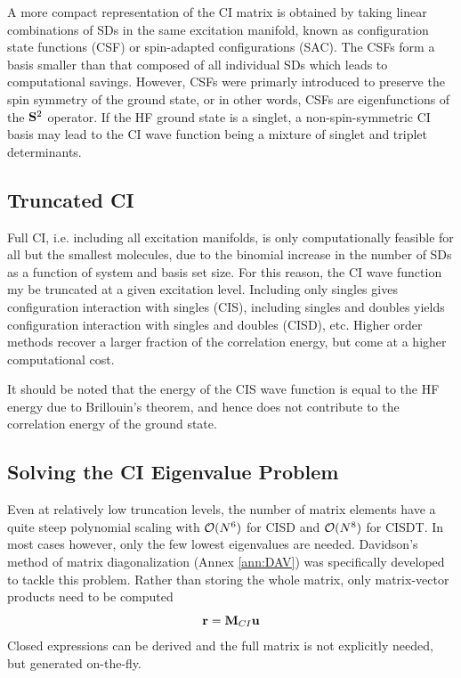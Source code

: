 A more compact representation of the CI matrix is obtained by taking linear combinations of SDs in the same excitation manifold, known as configuration state functions (CSF) or spin-adapted configurations (SAC). The CSFs form a basis smaller than that composed of all individual SDs which leads to computational savings. However, CSFs were primarly introduced to preserve the spin symmetry of the ground state, or in other words, CSFs are eigenfunctions of the $\mathbf{S}^2$ operator. If the HF ground state is a singlet, a non-spin-symmetric CI basis may lead to the CI wave function being a mixture of singlet and triplet determinants. 

\subsection{Truncated CI}

Full CI, i.e. including all excitation manifolds, is only computationally feasible for all but the smallest molecules, due to the binomial increase in the number of SDs as a function of system and basis set size. For this reason, the CI wave function my be truncated at a given excitation level. Including only singles gives configuration interaction with singles (CIS), including singles and doubles yields configuration interaction with singles and doubles (CISD), etc. Higher order methods recover a larger fraction of the correlation energy, but come at a higher computational cost.

It should be noted that the energy of the CIS wave function is equal to the HF energy due to Brillouin's theorem, and hence does not contribute to the correlation energy of the ground state.  

\subsection{Solving the CI Eigenvalue Problem}

Even at relatively low truncation levels, the number of matrix elements have a quite steep polynomial scaling with $\mathcal{O}(N^{6})$ for CISD and $\mathcal{O}(N^{8})$ for CISDT. In most cases however, only the few lowest eigenvalues are needed. Davidson's method of matrix diagonalization (Annex \ref{ann:DAV}) was specifically developed to tackle this problem. Rather than storing the whole matrix, only matrix-vector products need to be computed
\begin{equation}
\mathbf{r} = \mathbf{M}_{CI} \mathbf{u}
\end{equation}
\noindent Closed expressions can be derived and the full matrix is not explicitly needed, but generated on-the-fly. 

